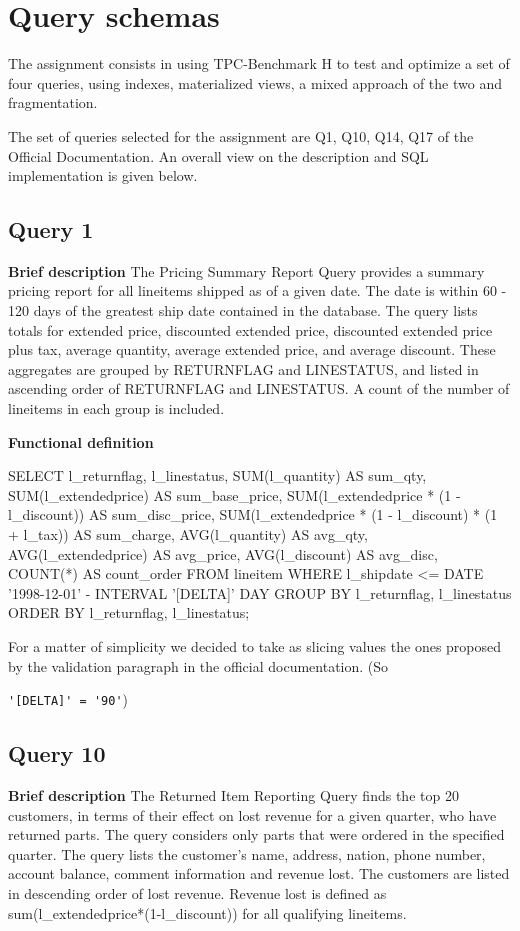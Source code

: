 
\section{Query schemas}

The assignment consists in using TPC-Benchmark H to test and optimize a set of four queries, using indexes, materialized views, a mixed approach of the two and fragmentation.

The set of queries selected for the assignment are Q1, Q10, Q14, Q17 of the Official Documentation. An overall view on the description and SQL implementation is given below.

\subsection{Query 1}
\textbf{Brief description}
The Pricing Summary Report Query provides a summary pricing report for all lineitems shipped as of a given date.
The date is within 60 - 120 days of the greatest ship date contained in the database. The query lists totals for
extended price, discounted extended price, discounted extended price plus tax, average quantity, average extended
price, and average discount. These aggregates are grouped by RETURNFLAG and LINESTATUS, and listed in
ascending order of RETURNFLAG and LINESTATUS. A count of the number of lineitems in each group is
included.

\textbf{Functional definition}
\begin{sql}
SELECT
    l_returnflag,
    l_linestatus,
    SUM(l_quantity) AS sum_qty,
    SUM(l_extendedprice) AS sum_base_price,
    SUM(l_extendedprice * (1 - l_discount)) AS sum_disc_price,
    SUM(l_extendedprice * (1 - l_discount) * (1 + l_tax)) AS sum_charge,
    AVG(l_quantity) AS avg_qty,
    AVG(l_extendedprice) AS avg_price,
    AVG(l_discount) AS avg_disc,
    COUNT(*) AS count_order
FROM
    lineitem
WHERE
    l_shipdate <= DATE '1998-12-01' - INTERVAL '[DELTA]' DAY
GROUP BY
    l_returnflag,
    l_linestatus
ORDER BY
    l_returnflag,
    l_linestatus;
\end{sql}

For a matter of simplicity we decided to take as slicing values the ones proposed by the validation paragraph in the official documentation. (So

\verb|'[DELTA]' = '90'|)

\subsection{Query 10}
\textbf{Brief description}
The Returned Item Reporting Query finds the top 20 customers, in terms of their effect on lost revenue for a given
quarter, who have returned parts. The query considers only parts that were ordered in the specified quarter. The
query lists the customer's name, address, nation, phone number, account balance, comment information and revenue
lost. The customers are listed in descending order of lost revenue. Revenue lost is defined as
sum(l\_extendedprice*(1-l\_discount)) for all qualifying lineitems.

